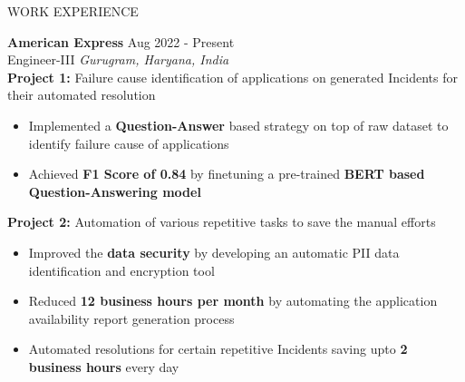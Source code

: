 \documentclass{resume} %
\begin{document}
\begin{rSection}{WORK EXPERIENCE}

\textbf{American Express} \hfill Aug 2022 - Present\\
Engineer-III \hfill \textit{Gurugram, Haryana, India}
\textbf{\\ Project 1:} Failure cause identification of applications on generated Incidents for their automated resolution

 \begin{itemize}
    \itemsep -3pt {} 
     \item Implemented a \textbf{Question-Answer} based strategy on top of raw dataset to identify failure cause of applications
     \item Achieved \textbf{F1 Score of 0.84} by finetuning a pre-trained \textbf{BERT based Question-Answering model}
 \end{itemize}

 \textbf{Project 2:} Automation of various repetitive tasks to save the manual efforts 

 \begin{itemize}
    \itemsep -3pt {}
     \item Improved the \textbf{data security} by developing an automatic PII data identification and encryption tool  
     \item Reduced \textbf{12 business hours per month} by automating the application availability report generation process
     \item Automated resolutions for certain repetitive Incidents saving upto \textbf{2 business hours} every day
 \end{itemize}
 

\end{rSection} 
\end{document}
